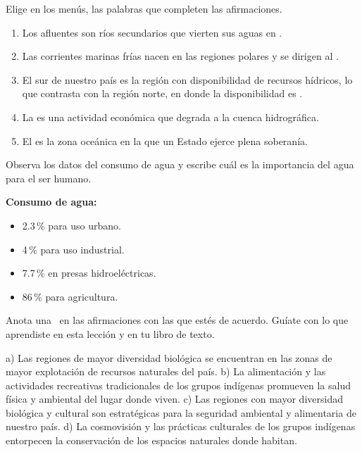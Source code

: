 \documentclass[11pt, a4paper, answers]{exam}
\begin{document}
\begin{questions}
\question Elige en los menús, las palabras que completen las afirmaciones.
\begin{enumerate}
    \item Los afluentes son ríos secundarios que vierten sus aguas en .
    \item Las corrientes marinas frías nacen en las regiones polares y se dirigen al \fillin[ecuador][3cm].
    \item El sur de nuestro país es la región con \fillin[mayor][2.5cm] disponibilidad de recursos hídricos, lo que contrasta con la región norte, en donde la disponibilidad es \fillin[baja][2.5cm].
    \item La \fillin[minería][3cm] es una actividad económica que degrada a la cuenca hidrográfica.
    \item El  es la zona oceánica en la que un Estado ejerce plena soberanía.
\end{enumerate}
\vspace{0.5cm}

\question Observa los datos del consumo de agua y escribe cuál es la importancia del agua para el ser humano.

\textbf{Consumo de agua:}
\begin{itemize}[label=$\circ$, nolistsep]
    \item 2.3\,\% para uso urbano.
    \item 4\,\% para uso industrial.
    \item 7.7\,\% en presas hidroeléctricas.
    \item 86\,\% para agricultura.
\end{itemize}
\makeemptybox{3cm}
\vspace{0.5cm}

\question Anota una \checkmark\ en las afirmaciones con las que estés de acuerdo. Guíate con lo que aprendiste en esta lección y en tu libro de texto.
\begin{checkboxes}
    \choice a) Las regiones de mayor diversidad biológica se encuentran en las zonas de mayor explotación de recursos naturales del país.
    \CorrectChoice b) La alimentación y las actividades recreativas tradicionales de los grupos indígenas promueven la salud física y ambiental del lugar donde viven.
    \CorrectChoice c) Las regiones con mayor diversidad biológica y cultural son estratégicas para la seguridad ambiental y alimentaria de nuestro país.
    \choice d) La cosmovisión y las prácticas culturales de los grupos indígenas entorpecen la conservación de los espacios naturales donde habitan.
\end{checkboxes}
\vspace{0.5cm}


\end{questions}
\end{document}
